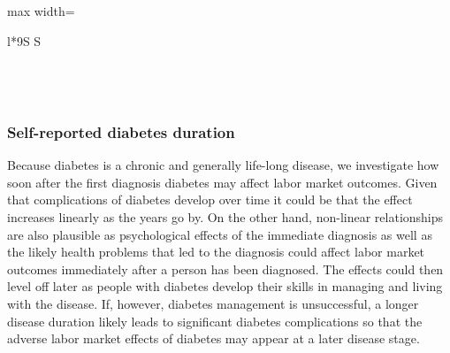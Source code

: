 \documentclass[12pt,english,british]{article}
\newcommand{\sym}[1]{\rlap{#1}}%
\begin{document}
\begin{table}[h]
\begin{center}
\begin{adjustbox}{max width=\textwidth}
{\begin{tabular}{l*{9}{S
S}}
\bottomrule
{}\\
\\
\\
\multicolumn{10}{l}{\footnotesize \sym{*} \(p<0.10\), \sym{**} \(p<0.05\), \sym{***} \(p<0.01\)}\\
\end{tabular}
}
\end{adjustbox}
\end{center}
\end{table}  

\FloatBarrier

\subsubsection*{Self-reported diabetes duration}

Because diabetes is a chronic and generally life-long disease, we investigate how soon after the first diagnosis diabetes may affect labor market outcomes. Given that complications of diabetes develop over time it could be that the effect increases
linearly as the years go by. On the other hand, non-linear relationships
are also plausible as psychological effects of the immediate diagnosis
as well as the likely health problems that led to the diagnosis could
affect labor market outcomes immediately after a person has been
diagnosed. The effects could then level off later as people with diabetes
develop their skills in managing and living with the disease. If, however, diabetes management is unsuccessful, a longer disease duration likely leads to significant diabetes complications so that the adverse labor market effects of diabetes may appear at a later disease stage.
\end{document}
